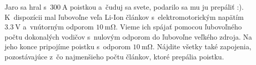 Jaro sa hral s~$\SI{300}{\ampere}$ poistkou a~čuduj sa svete, podarilo sa mu ju prepáliť :).
K~dispozícii mal ľubovoľne veľa Li-Ion článkov s~elektromotorickým napätím $\SI{3.3}{\volt}$ a~vnútorným odporom $\SI{10}{\milli\ohm}$.
Vieme ich spájať pomocou ľubovoľného počtu dokonalých vodičov s~nulovým odporom do ľubovoľne veľkého zdroja.
Na jeho konce pripojíme poistku s~odporom $\SI{10}{\milli\ohm}$. Nájdite všetky také zapojenia,
pozostávajúce z~čo najmenšieho počtu článkov, ktoré prepália poistku.
